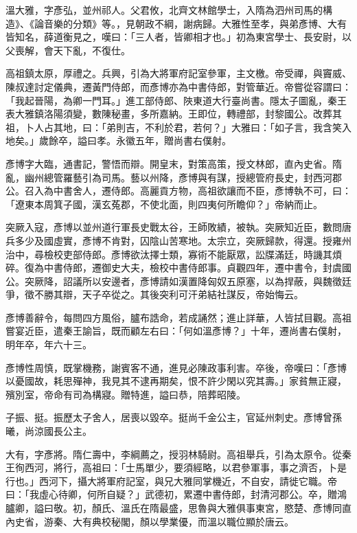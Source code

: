 
\begin{pinyinscope}

 溫大雅，字彥弘，並州祁人。父君攸，北齊文林館學士，入隋為泗州司馬的構造》、《論音樂的分類》等。，見朝政不綱，謝病歸。大雅性至孝，與弟彥博、大有皆知名，薛道衡見之，嘆曰：「三人者，皆卿相才也。」初為東宮學士、長安尉，以父喪解，會天下亂，不復仕。



 高祖鎮太原，厚禮之。兵興，引為大將軍府記室參軍，主文檄。帝受禪，與竇威、陳叔達討定儀典，遷黃門侍郎，而彥博亦為中書侍郎，對管華近。帝嘗從容謂曰：「我起晉陽，為卿一門耳。」進工部侍郎、陜東道大行臺尚書。隱太子圖亂，秦王表大雅鎮洛陽須變，數陳秘畫，多所嘉納。王即位，轉禮部，封黎國公。改葬其祖，卜人占其地，曰：「弟則吉，不利於君，若何？」大雅曰：「如子言，我含笑入地矣。」歲餘卒，謚曰孝。永徽五年，贈尚書右僕射。



 彥博字大臨，通書記，警悟而辯。開皇末，對策高策，授文林郎，直內史省。隋亂，幽州總管羅藝引為司馬。藝以州降，彥博與有謀，授總管府長史，封西河郡公。召入為中書舍人，遷侍郎。高麗貢方物，高祖欲讓而不臣，彥博執不可，曰：「遼東本周箕子國，漢玄菟郡，不使北面，則四夷何所瞻仰？」帝納而止。



 突厥入寇，彥博以並州道行軍長史戰太谷，王師敗績，被執。突厥知近臣，數問唐兵多少及國虛實，彥博不肯對，囚陰山苦寒地。太宗立，突厥歸款，得還。授雍州治中，尋檢校吏部侍郎。彥博欲汰擇士類，寡術不能厭眾，訟牒滿廷，時譏其煩碎。復為中書侍郎，遷御史大夫，檢校中書侍郎事。貞觀四年，遷中書令，封虞國公。突厥降，詔議所以安邊者，彥博請如漢置降匈奴五原塞，以為捍蔽，與魏徵廷爭，徵不勝其辯，天子卒從之。其後突利可汗弟結社謀反，帝始悔云。



 彥博善辭令，每問四方風俗，臚布誥命，若成誦然；進止詳華，人皆拭目觀。高祖嘗宴近臣，遣秦王諭旨，既而顧左右曰：「何如溫彥博？」十年，遷尚書右僕射，明年卒，年六十三。



 彥博性周慎，既掌機務，謝賓客不通，進見必陳政事利害。卒後，帝嘆曰：「彥博以憂國故，耗思殫神，我見其不逮再期矣，恨不許少閑以究其壽。」家貧無正寢，殯別室，帝命有司為構寢。贈特進，謚曰恭，陪葬昭陵。



 子振、挺。振歷太子舍人，居喪以毀卒。挺尚千金公主，官延州刺史。彥博曾孫曦，尚涼國長公主。



 大有，字彥將。隋仁壽中，李綱薦之，授羽林騎尉。高祖舉兵，引為太原令。從秦王徇西河，將行，高祖曰：「士馬單少，要須經略，以君參軍事，事之濟否，卜是行也。」西河下，攝大將軍府記室，與兄大雅同掌機近，不自安，請徙它職。帝曰：「我虛心待卿，何所自疑？」武德初，累遷中書侍郎，封清河郡公。卒，贈鴻臚卿，謚曰敬。初，顏氏、溫氏在隋最盛，思魯與大雅俱事東宮，愍楚、彥博同直內史省，游秦、大有典校秘閣，顏以學業優，而溫以職位顯於唐云。




\end{pinyinscope}
